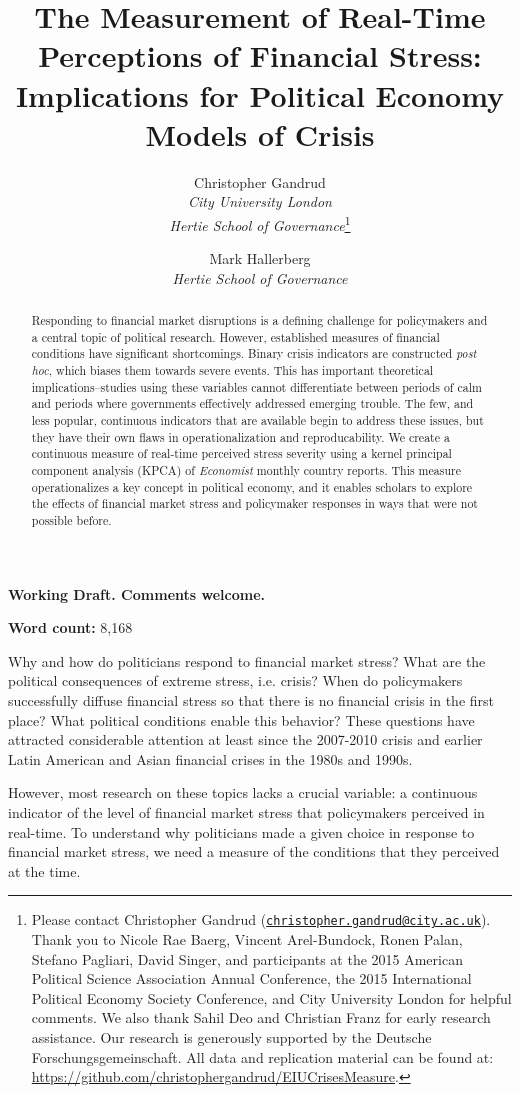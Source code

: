 \documentclass[]{article}
\title{The Measurement of Real-Time Perceptions of Financial Stress: Implications for Political Economy Models of Crisis}
\author{Christopher Gandrud \\ \emph{City University London} \\ \emph{Hertie School of Governance}\footnote{Please contact Christopher Gandrud
(\href{mailto:christopher.gandrud@city.ac.uk}{\nolinkurl{christopher.gandrud@city.ac.uk}}).
Thank you to Nicole Rae Baerg, Vincent Arel-Bundock, Ronen Palan, Stefano Pagliari, David Singer, and participants at the 2015 American Political Science Association Annual Conference, the 2015 International Political Economy Society Conference, and City University London for helpful comments. We also thank Sahil Deo and Christian Franz for early research assistance. Our research is generously supported by the Deutsche Forschungsgemeinschaft. All data and replication material can be found at:
\url{https://github.com/christophergandrud/EIUCrisesMeasure}.}
\and
Mark Hallerberg \\ \emph{Hertie School of Governance}}
\begin{document}
\maketitle

\begin{center}
    \textbf{Working Draft. Comments welcome.}
\end{center}


\begin{abstract}

Responding to financial market disruptions is a defining challenge for policymakers and a central topic of political research. However, established measures of financial conditions have significant shortcomings. Binary crisis indicators \cite[e.g.][]{laeven2013} are constructed \emph{post hoc}, which biases them towards severe events. This has important theoretical implications--studies using these variables cannot differentiate between periods of calm and periods where governments effectively addressed emerging trouble. The few, and less popular, continuous indicators that are available begin to address these issues, but they have their own flaws in operationalization and reproducability. We create a continuous measure of real-time perceived stress severity using a kernel principal component analysis (KPCA) of \emph{Economist} monthly country reports. This measure operationalizes a key concept in political economy, and it enables scholars to explore the effects of financial market stress and policymaker responses in ways that were not possible before.

\end{abstract}


\textbf{Word count:} 8,168

\clearpage

Why and how do politicians respond to financial market stress? What are the political consequences of extreme stress, i.e. crisis? When do policymakers successfully diffuse financial stress so that there is no financial crisis in the first place? What political conditions enable this behavior? These questions have attracted considerable attention at least since the 2007-2010 crisis and earlier Latin American and Asian financial crises in the 1980s and 1990s.

However, most research on these topics lacks a crucial variable: a continuous indicator of the level of financial market stress that policymakers perceived in real-time. To understand why politicians made a given choice in response to financial market stress, we need a measure of the conditions that they perceived at the time.
\end{document}
